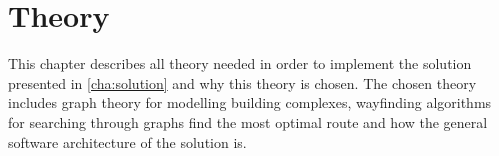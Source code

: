 \chapter{Theory}

This chapter describes all theory needed in order to implement the solution presented in \cref{cha:solution} and why this theory is chosen. The chosen theory includes graph theory for modelling building complexes, wayfinding algorithms for searching through graphs find the most optimal route and how the general software architecture of the solution is.



%

%
%




